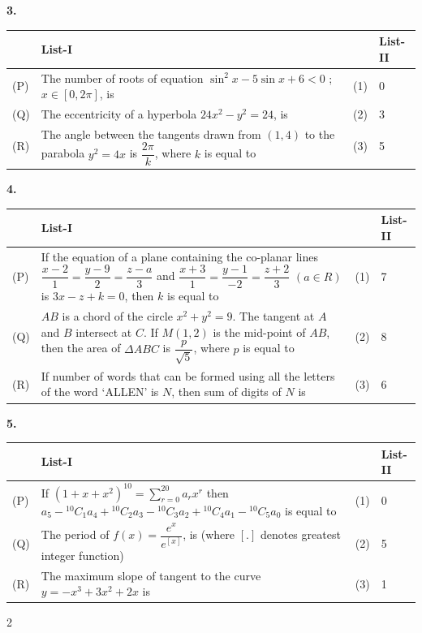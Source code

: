 \documentclass[10pt]{extarticle}
\newcommand{\qn}[1]{\par\smallskip\noindent\textbf{#1.}~}
\begin{document}
\noindent\qn{3}\par\nopagebreak\smallskip
\begin{center}\small
\begin{tabular}{|p{1cm}|p{8cm}|p{1cm}|p{1.5cm}|}\hline
 & \textbf{List-I} & & \textbf{List-II}\\\hline
(P) & The number of roots of equation $\sin^2x-5\sin x+6<0$ ; $x\in[0,2\pi]$, is & (1) & 0\\\hline
(Q) & The eccentricity of a hyperbola $24x^2-y^2=24$, is & (2) & 3\\\hline
(R) & The angle between the tangents drawn from $(1,4)$ to the parabola $y^2=4x$ is $\dfrac{2\pi}k$, where $k$ is equal to & (3) & 5\\\hline
\end{tabular}
\end{center}
\noindent\qn{4}\par\nopagebreak\smallskip
\begin{center}\small
\begin{tabular}{|p{1cm}|p{8.5cm}|p{1cm}|p{1.5cm}|}\hline
 & \textbf{List-I} & & \textbf{List-II}\\\hline
(P) & If the equation of a plane containing the co-planar lines $\dfrac{x-2}1=\dfrac{y-9}2=\dfrac{z-a}3$ and $\dfrac{x+3}1=\dfrac{y-1}{-2}=\dfrac{z+2}3$ $(a\in R)$ is $3x-z+k=0$, then $k$ is equal to & (1) & 7\\\hline
(Q) & $AB$ is a chord of the circle $x^2+y^2=9$. The tangent at $A$ and $B$ intersect at $C$. If $M(1,2)$ is the mid-point of $AB$, then the area of $\Delta ABC$ is $\dfrac p{\sqrt5}$, where $p$ is equal to & (2) & 8\\\hline
(R) & If number of words that can be formed using all the letters of the word `ALLEN' is $N$, then sum of digits of $N$ is & (3) & 6\\\hline
\end{tabular}
\end{center}
\noindent\qn{5}\par\nopagebreak\smallskip
\begin{center}\small
\begin{tabular}{|p{1cm}|p{8.5cm}|p{1cm}|p{1.5cm}|}\hline
 & \textbf{List-I} & & \textbf{List-II}\\\hline
(P) & If $(1+x+x^2)^{10}=\displaystyle\sum_{r=0}^{20}a_rx^r$ then $a_5-{}^{10}C_1a_4+{}^{10}C_2a_3-{}^{10}C_3a_2+{}^{10}C_4a_1-{}^{10}C_5a_0$ is equal to & (1) & 0\\\hline
(Q) & The period of $f(x)=\dfrac{e^x}{e^{[x]}}$, is (where $[.]$ denotes greatest integer function) & (2) & 5\\\hline
(R) & The maximum slope of tangent to the curve $y=-x^3+3x^2+2x$ is & (3) & 1\\\hline
\end{tabular}
\end{center}
\begin{multicols}{2}
\end{multicols}
\end{document}
